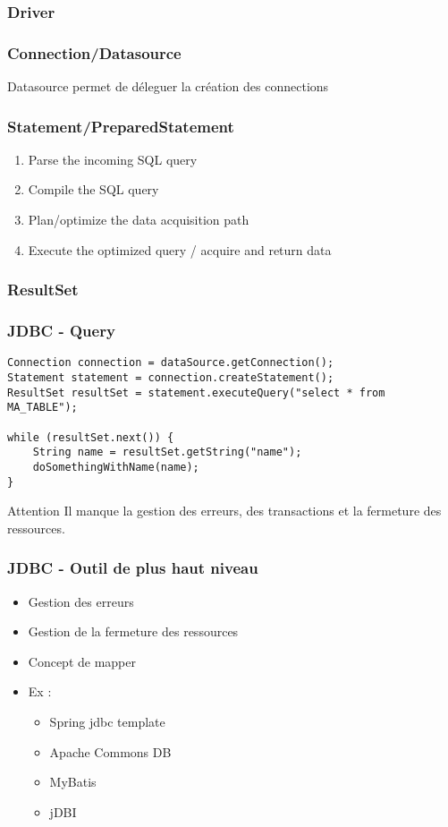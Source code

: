 \documentclass[t,12pt]{beamer}
\begin{document}
\begin{frame}
	\frametitle{Driver}
\end{frame}

\begin{frame}
	\frametitle{Connection/Datasource}

	Datasource permet de d\'eleguer la cr\'eation des connections
\end{frame}

\begin{frame}
	\frametitle{Statement/PreparedStatement}

	\begin{enumerate}
		\item Parse the incoming SQL query 
		\item Compile the SQL query
		\item Plan/optimize the data acquisition path
		\item Execute the optimized query / acquire and return data 
	\end{enumerate}
\end{frame}

\begin{frame}
	\frametitle{ResultSet}
\end{frame}

\begin{frame}[fragile]
	\frametitle{JDBC - Query}

	\begin{lstlisting}[frame=single]
Connection connection = dataSource.getConnection();
Statement statement = connection.createStatement();
ResultSet resultSet = statement.executeQuery("select * from MA_TABLE");

while (resultSet.next()) {
    String name = resultSet.getString("name");
    doSomethingWithName(name);
}
	\end{lstlisting}

	\begin{alertblock}{Attention}
		Il manque la gestion des erreurs, des transactions et la fermeture des ressources.
	\end{alertblock}
\end{frame}

\begin{frame}
	\frametitle{JDBC - Outil de plus haut niveau}
	
	\begin{itemize}
		\item Gestion des erreurs
		\item Gestion de la fermeture des ressources
		\item Concept de mapper
		\item Ex : 
			\begin{itemize}
				\item Spring jdbc template
				\item Apache Commons DB
				\item MyBatis
				\item jDBI
			\end{itemize}
	\end{itemize}
\end{frame}
\end{document}
